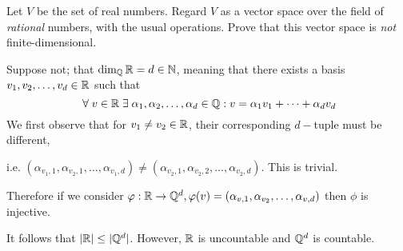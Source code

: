 \documentclass[a4paper, 10pt]{article}
\begin{document}
\begin{problem} 
Let \(V\) be the set of real numbers. Regard \(V\) as a vector space over the field of \textit{rational} numbers, with the usual operations. Prove that this vector space is \textit{not} finite-dimensional.
\end{problem}
\begin{solution}
    Suppose not; that \(\dim_{\mathbb{Q}} \mathbb{R} = d \in \mathbb{N}\), meaning that there exists a basis \(v_1, v_2, \dots, v_d \in \mathbb{R}\) such that \[
        \forall v \in \bbr \exists \alpha_1, \alpha_2, \dots, \alpha_d \in \bbq: v = \alpha_1v_1 + \dots + \alpha_dv_d
    \]
    We first observe that for \(v_1 \neq v_2 \in \mathbb{R}\), their corresponding \(d-\)tuple must be different,

    i.e. \((\alpha_{v_1, 1}, \alpha_{v_2, 1}, \dots, \alpha_{v_1, d}) \neq (\alpha_{v_2, 1}, \alpha_{v_2, 2}, \dots, \alpha_{v_2, d})\). This is trivial.

    Therefore if we consider \(\varphi: \mathbb{R} \to \mathbb{Q}^d, \varphi(v) = (\alpha_{v, 1}, \alpha_{v_2}, \dots, \alpha_{v, d})\) then \(\phi\) is injective. 

    It follows that \(\lvert\mathbb{R}\rvert \leq \lvert\mathbb{Q}^d\rvert\). However, \(\mathbb{R}\) is uncountable and \(\mathbb{Q}^d\) is countable. \contra
\end{solution}
\end{document}
